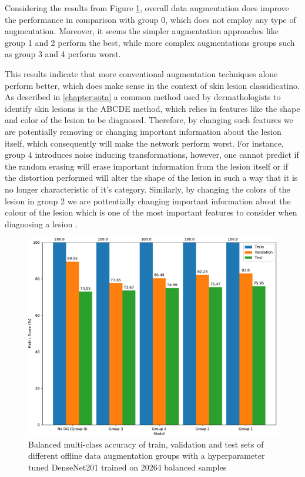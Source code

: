     Considering the results from Figure \ref{fig:data_aug_group_bal_acc_comp}, overall data augmentation does improve the performance in comparison with group 0, which does not employ any type of augmentation. Moreover, it seems the simpler augmentation approaches like group 1 and 2 perform the best, while more complex augmentations groups such as group 3 and 4 perform worst.   \par
    
    This results indicate that more conventional augmentation techniques alone perform better, which does make sense in the context of skin lesion classidicatino. As described in \autoref{chapter:sota} a common method used by dermathologists to identify skin lesions is the ABCDE method, which relies in features like the shape and color of the lesion to be diagnosed. Therefore, by changing such features we are potentially removing or changing important information about the lesion itself, which consequently will make the network perform worst. For instance, group 4 introduces noise inducing transformations, however, one cannot predict if the random erasing will erase important information from the lesion itself or if the distortion performed will alter the shape of the lesion in such a way that it is no longer characteristic of it's category. Similarly, by changing the colors of the lesion in group 2 we are pottentially changing important information about the colour of the lesion which is one of the most important features to consider when diagnosing a lesion \cite{?}.  \par
    
    \begin{figure}[ht]
        \centering
        \includegraphics[width=\textwidth]{figs/data_aug_group_bal_acc_comp.pdf}
        \caption{Balanced multi-class accuracy of train, validation and test sets of different offline data augmentation groups with a hyperparameter tuned DenseNet201 trained on 20264 balanced samples}
        \label{fig:data_aug_group_bal_acc_comp}
    \end{figure}
    
